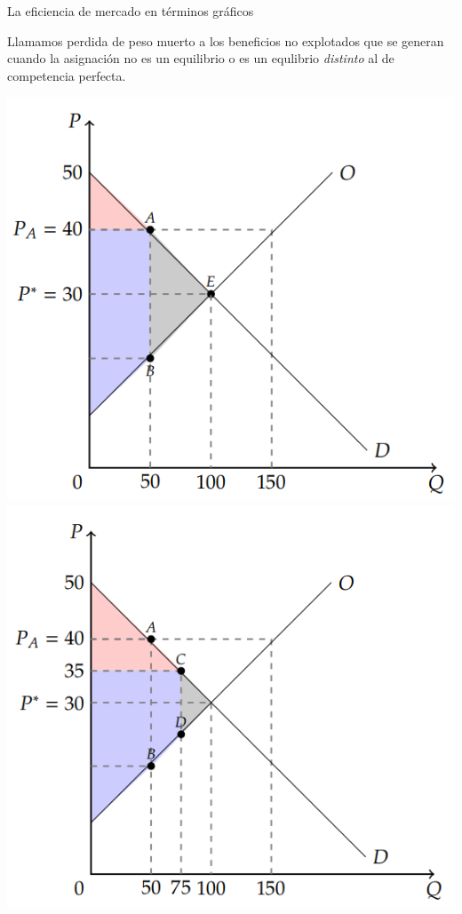 \documentclass{beamer}
\begin{document}
\begin{frame}{La eficiencia de mercado en términos gráficos}
  \begin{boxA}
    \centering
    Llamamos perdida de peso muerto a los beneficios no explotados que se generan cuando la asignación no es un equilibrio o es un equlibrio \textit{distinto} al de competencia perfecta.
  \end{boxA}
  \centering
  \includegraphics[scale=0.4]{../Figures/C17.10.png}
  \includegraphics[scale=0.4]{../Figures/C17.11.png}
\end{frame}
\end{document}
